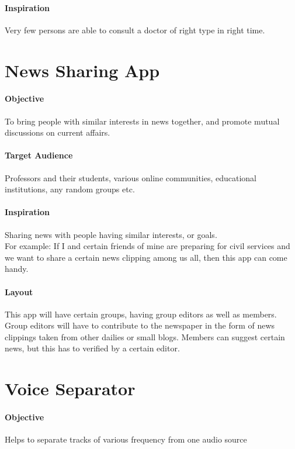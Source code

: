 \documentclass{article}
\begin{document}
\paragraph{Inspiration}
Very few persons are able to consult a doctor of right type in right time.

\clearpage

\section{News Sharing App}
\paragraph{Objective}
To bring people with similar interests in news together, and promote mutual discussions on current affairs.
\paragraph{Target Audience}
Professors and their students, various online communities, educational institutions, any random groups etc.
\paragraph{Inspiration}
Sharing news with people having similar interests, or goals. \\
For example: If I and certain friends of mine are preparing for civil services and we want to share a certain news clipping among us all, then this app can come handy. 

\paragraph{Layout}
This app will have certain groups, having group editors as well as members.
Group editors will have to contribute to the newspaper in the form of news clippings taken from other dailies or small blogs.
Members can suggest certain news, but this has to verified by a certain editor. 

\vspace{1cm}

\section{Voice Separator}
\paragraph{Objective}
Helps to separate tracks of various frequency from one audio source
\end{document}
